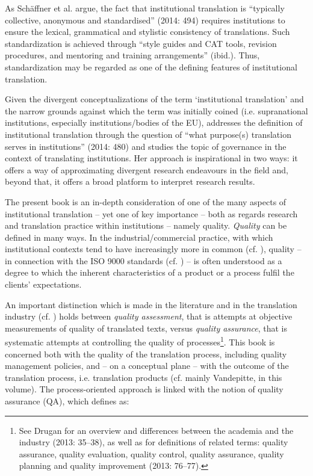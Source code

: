 \documentclass[output=paper]{langsci/langscibook}
\begin{document}
As Schäffner et al. argue, the fact that institutional translation is “typically collective, anonymous and standardised” (2014: 494) requires institutions to ensure the lexical, grammatical and stylistic consistency of translations. Such standardization is achieved through “style guides and CAT tools, revision procedures, and mentoring and training arrangements” (ibid.). Thus, standardization may be regarded as one of the defining features of institutional translation.

Given the divergent conceptualizations of the term ‘institutional translation’ and the narrow grounds against which the term was initially coined (i.e. supranational institutions, especially institutions/bodies of the EU), \citet{Koskinen2014} addresses the definition of institutional translation through the question of “what purpose(s) translation serves in institutions” (2014: 480) and studies the topic of governance in the context of translating institutions. Her approach is inspirational in two ways: it offers a way of approximating divergent research endeavours in the field and, beyond that, it offers a broad platform to interpret research results. 

The present book is an in-depth consideration of one of the many aspects of institutional translation – yet one of key importance – both as regards research and translation practice within institutions – namely quality. \textit{Quality} can be defined in many ways. In the industrial/commercial practice, with which institutional contexts tend to have increasingly more in common (cf. \citealt{Mossop2006}), quality – in connection with the ISO 9000 standards (cf. \citealt{ISO2015b}) – is often understood as a degree to which the inherent characteristics of a product or a process fulfil the clients’ expectations. 

An important distinction which is made in the literature and in the translation industry (cf. \citealt{Drugan2013}) holds between \textit{quality assessment}, that is attempts at objective measurements of quality of translated texts, versus \textit{quality assurance}, that is systematic attempts at controlling the quality of processes\footnote{See Drugan for an overview and differences between the academia and the industry (2013: 35--38), as well as for definitions of related terms: quality assurance, quality evaluation, quality control, quality assurance, quality planning and quality improvement (2013: 76--77).}. This book is concerned both with the quality of the translation process, including quality management policies, and – on a conceptual plane – with the outcome of the translation process, i.e. translation products (cf. mainly Vandepitte, in this volume). The process-oriented approach is linked with the notion of quality assurance (QA), which \citet{Mossop2001} defines as:
\end{document}
